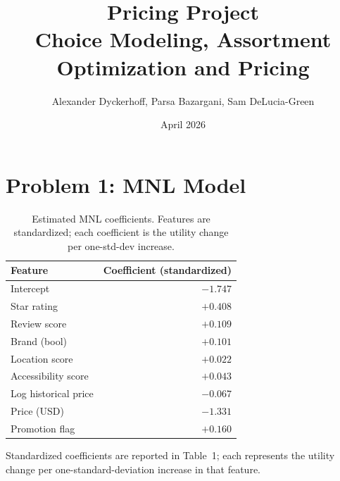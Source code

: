 \documentclass[11pt]{article}
\title{Pricing Project\\[0.4ex]
\large Choice Modeling, Assortment Optimization and Pricing}
\author{Alexander Dyckerhoff, Parsa Bazargani, 
Sam DeLucia-Green }
\date{April 2026}
\begin{document}
\maketitle
\tableofcontents
\newpage

\section{Problem 1: MNL Model}

\begin{table}[h]
\centering
\begin{tabular}{lr}
\toprule
Feature & Coefficient (standardized) \\
\midrule
Intercept                   & $-1.747$ \\
Star rating                 & $+0.408$ \\
Review score                & $+0.109$ \\
Brand (bool)                & $+0.101$ \\
Location score              & $+0.022$ \\
Accessibility score         & $+0.043$ \\
Log historical price        & $-0.067$ \\
Price (USD)                 & $-1.331$ \\
Promotion flag              & $+0.160$ \\
\bottomrule
\end{tabular}
\caption{Estimated MNL coefficients. Features are standardized; each coefficient is the utility change per one-std-dev increase.}
\end{table}

Standardized coefficients are reported in Table~1; each represents the utility change per one-standard-deviation increase in that feature.
\end{document}
